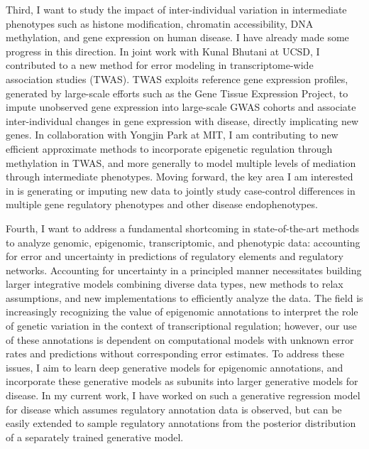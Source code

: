 \documentclass[11pt]{article}
\begin{document}
Third, I want to study the impact of inter-individual variation in intermediate
phenotypes such as histone modification, chromatin accessibility, DNA
methylation, and gene expression on human disease. I have already made some
progress in this direction. In joint work with Kunal Bhutani at UCSD, I
contributed to a new method for error modeling in transcriptome-wide
association studies (TWAS). TWAS exploits reference gene expression profiles,
generated by large-scale efforts such as the Gene Tissue Expression Project, to
impute unobserved gene expression into large-scale GWAS cohorts and associate
inter-individual changes in gene expression with disease, directly implicating
new genes. In collaboration with Yongjin Park at MIT, I am contributing to new
efficient approximate methods to incorporate epigenetic regulation through
methylation in TWAS, and more generally to model multiple levels of mediation
through intermediate phenotypes. Moving forward, the key area I am interested
in is generating or imputing new data to jointly study case-control differences
in multiple gene regulatory phenotypes and other disease endophenotypes.

Fourth, I want to address a fundamental shortcoming in state-of-the-art methods
to analyze genomic, epigenomic, transcriptomic, and phenotypic data: accounting
for error and uncertainty in predictions of regulatory elements and regulatory
networks. Accounting for uncertainty in a principled manner necessitates
building larger integrative models combining diverse data types, new methods to
relax assumptions, and new implementations to efficiently analyze the data. The
field is increasingly recognizing the value of epigenomic annotations to
interpret the role of genetic variation in the context of transcriptional
regulation; however, our use of these annotations is dependent on computational
models with unknown error rates and predictions without corresponding error
estimates. To address these issues, I aim to learn deep generative models for
epigenomic annotations, and incorporate these generative models as subunits
into larger generative models for disease. In my current work, I have worked on
such a generative regression model for disease which assumes regulatory
annotation data is observed, but can be easily extended to sample regulatory
annotations from the posterior distribution of a separately trained generative
model.
\end{document}
